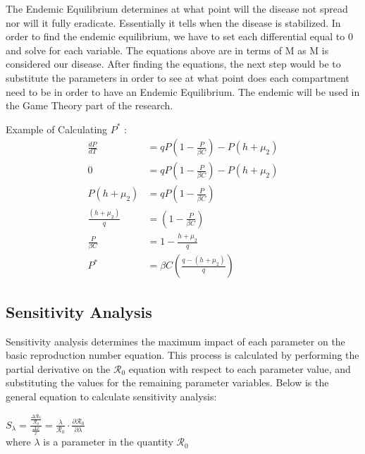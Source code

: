 \documentclass[12pt]{article}
\begin{document}
The Endemic Equilibrium determines at what point will the disease not spread nor will it fully eradicate. Essentially it tells when the disease is stabilized. In order to find the endemic equilibrium, we have to set each differential equal to 0 and solve for each variable. The equations above are in terms of M as M is considered our disease. After finding the equations, the next step would be to substitute the parameters in order to see at what point does each compartment need to be in order to have an Endemic Equilibrium. The endemic will be used in the Game Theory part of the research. 

Example of Calculating $P^{*}$ :
\begin{align*}
        \frac{dP}{dT} &= qP\left(1-\frac{P}{\beta C}\right) - P(h + \mu_{2})\\
        0 &= qP\left(1-\frac{P}{\beta C}\right) - P(h + \mu_{2})\\
        P(h+ \mu_{2}) &= qP\left(1-\frac{P}{\beta C}\right)\\
        \frac{(h+ \mu_{2})}{q} &= \left(1-\frac{P}{\beta C}\right)\\
        \frac{P}{\beta C} &= 1 - \frac{h+\mu_{2}}{q}\\
        P^{*} &= \beta C \left(\frac{q-(h+\mu_{2})}{q}\right)
    \end{align*}

\subsection{Sensitivity Analysis}
Sensitivity analysis determines the maximum impact of each parameter on the basic reproduction number equation. This process is calculated by performing the partial derivative on the $\mathscr{R}_0$ equation with respect to each parameter value, and substituting the values for the remaining parameter variables. Below is the general equation to calculate sensitivity analysis: \\
\begin{center}
    $S_{\lambda} = \frac{\frac{\Delta \mathscr{R}_{0}}{\mathscr{R}_{0}}}{\frac{\Delta x}{x}} = \frac{\lambda}{\mathscr{R}_{0}} \cdot \frac{\partial \mathscr{R}_{0}}{\partial \lambda}$ \\
    where $\lambda$ is a parameter in the quantity $\mathscr{R}_{0}$
\end{center}
\end{document}
